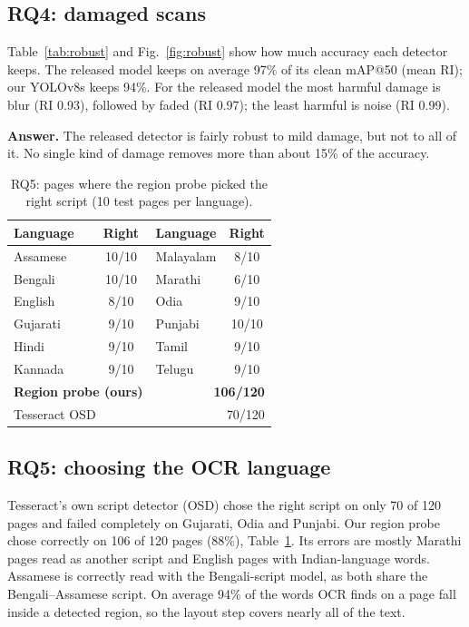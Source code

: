\documentclass[conference]{IEEEtran}
\begin{document}
\subsection{RQ4: damaged scans}
Table~\ref{tab:robust} and Fig.~\ref{fig:robust} show how much accuracy each detector keeps. The released model
keeps on average 97\% of its clean mAP@50 (mean RI); our YOLOv8s keeps 94\%. For the released model
the most harmful damage is blur (RI 0.93), followed by faded (RI 0.97); the least harmful is noise (RI 0.99).

\textbf{Answer.} The released detector is fairly robust to mild damage, but not to all of it. No single kind of damage removes more than about 15\% of the accuracy.

\begin{table}[t]
\centering
\caption{RQ5: pages where the region probe picked the right script (10 test pages per language).}
\label{tab:ocr}
\small
\begin{tabular}{lclc}
\toprule
Language & Right & Language & Right \\
\midrule
Assamese & 10/10 & Malayalam & 8/10 \\
Bengali & 10/10 & Marathi & 6/10 \\
English & 8/10 & Odia & 9/10 \\
Gujarati & 9/10 & Punjabi & 10/10 \\
Hindi & 9/10 & Tamil & 9/10 \\
Kannada & 9/10 & Telugu & 9/10 \\
\midrule
\multicolumn{2}{l}{\textbf{Region probe (ours)}} & \multicolumn{2}{r}{\textbf{106/120}} \\
\multicolumn{2}{l}{Tesseract OSD} & \multicolumn{2}{r}{70/120} \\
\bottomrule
\end{tabular}
\end{table}

\subsection{RQ5: choosing the OCR language}
Tesseract's own script detector (OSD) chose the right script on only 70 of 120 pages and failed completely on
Gujarati, Odia and Punjabi. Our region probe chose correctly on 106 of 120 pages (88\%), Table~\ref{tab:ocr}. Its
errors are mostly Marathi pages read as another script and English pages with Indian-language words. Assamese is
correctly read with the Bengali-script model, as both share the Bengali--Assamese script. On average 94\% of the
words OCR finds on a page fall inside a detected region, so the layout step covers nearly all of the text.
\end{document}
